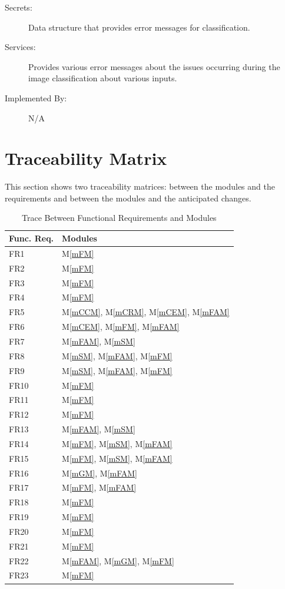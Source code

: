 \documentclass[12pt, titlepage]{article}
\newcommand{\mref}[1]{M\ref{#1}}
\begin{document}
\begin{description}
\item[Secrets:] Data structure that provides error messages for classification.
\item[Services:] Provides various error messages about the issues occurring during the image classification about various inputs.
\item[Implemented By:] N/A
\end{description}

\section{Traceability Matrix} \label{SecTM}

This section shows two traceability matrices: between the modules and the
requirements and between the modules and the anticipated changes.

\begin{table}[H]
\centering
\begin{tabular}{p{} p{}}
\toprule
\textbf{Func. Req.} & \textbf{Modules}\\
\midrule
FR1 & \mref{mFM}\\
FR2 & \mref{mFM}\\
FR3 & \mref{mFM}\\
FR4 & \mref{mFM}\\
FR5 & \mref{mCCM}, \mref{mCRM}, \mref{mCEM}, \mref{mFAM}\\
FR6 & \mref{mCEM}, \mref{mFM}, \mref{mFAM}\\
FR7 & \mref{mFAM}, \mref{mSM}\\
FR8 & \mref{mSM}, \mref{mFAM}, \mref{mFM}\\
FR9 & \mref{mSM}, \mref{mFAM}, \mref{mFM}\\
FR10 & \mref{mFM}\\
FR11 & \mref{mFM}\\
FR12 & \mref{mFM}\\
FR13 & \mref{mFAM}, \mref{mSM}\\
FR14 & \mref{mFM}, \mref{mSM}, \mref{mFAM}\\
FR15 & \mref{mFM}, \mref{mSM}, \mref{mFAM}\\
FR16 & \mref{mGM}, \mref{mFAM}\\
FR17 & \mref{mFM}, \mref{mFAM}\\
FR18 & \mref{mFM}\\
FR19 & \mref{mFM}\\
FR20 & \mref{mFM}\\
FR21 & \mref{mFM}\\
FR22 & \mref{mFAM}, \mref{mGM}, \mref{mFM}\\
FR23 & \mref{mFM} \\
\bottomrule
\end{tabular}
\caption{Trace Between Functional Requirements and Modules}
\label{TblFRT}
\end{table}
\end{document}
